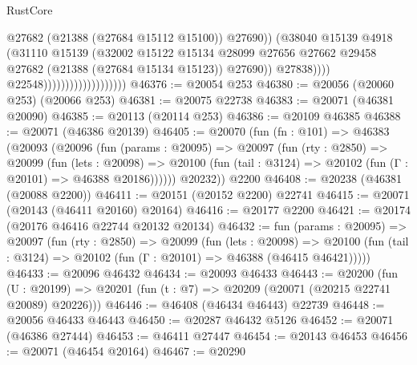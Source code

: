 \begin{lexlean}{RustCore}
\begin{coremodule}
                                                    @27682
                                                    (@21388 (@27684 @15112 @15100))
                                                    @27690))
                                                (@38040
                                                  @15139
                                                  @4918
                                                  (@31110
                                                    @15139
                                                    (@32002
                                                      @15122
                                                      @15134
                                                      @28099
                                                      @27656
                                                      @27662
                                                      @29458
                                                      @27682
                                                      (@21388 (@27684 @15134 @15123))
                                                      @27690))
                                                  @27838))))
                                          @22548)))))))))))))))))))
@46376 := @20054 @253
@46380 := @20056 (@20060 @253) (@20066 @253)
@46381 := @20075 @22738
@46383 := @20071 (@46381 @20090)
@46385 := @20113 (@20114 @253)
@46386 := @20109 @46385
@46388 := @20071 (@46386 @20139)
@46405 := @20070
    (fun (fn : @101) =>
    @46383
      (@20093
        (@20096
          (fun (params : @20095) =>
          @20097
            (fun (rty : @2850) =>
            @20099
              (fun (lets : @20098) =>
              @20100 (fun (tail : @3124) => @20102 (fun (Γ : @20101) => @46388 @20186))))))
        @20232))
    @2200
@46408 := @20238 (@46381 (@20088 @2200))
@46411 := @20151 (@20152 @2200) @22741
@46415 := @20071 (@20143 (@46411 @20160) @20164)
@46416 := @20177 @2200
@46421 := @20174 (@20176 @46416 @22744 @20132 @20134)
@46432 := fun (params : @20095) =>
  @20097
    (fun (rty : @2850) =>
    @20099
      (fun (lets : @20098) =>
      @20100 (fun (tail : @3124) => @20102 (fun (Γ : @20101) => @46388 (@46415 @46421)))))
@46433 := @20096 @46432
@46434 := @20093 @46433
@46443 := @20200
    (fun (U : @20199) => @20201 (fun (t : @7) => @20209 (@20071 (@20215 @22741 @20089) @20226)))
@46446 := @46408 (@46434 @46443) @22739
@46448 := @20056 @46433 @46443
@46450 := @20287 @46432 @5126
@46452 := @20071 (@46386 @27444)
@46453 := @46411 @27447
@46454 := @20143 @46453
@46456 := @20071 (@46454 @20164)
@46467 := @20290

\end{coremodule}
\end{lexlean}
